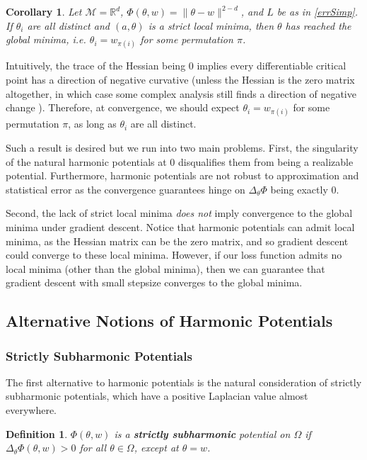 \documentclass{article}
\newtheorem{corollary}[theorem]{Corollary}
\newtheorem{definition}[theorem]{Definition}
\newcommand{\R}{{\mathbb{R}}}
\begin{document}
\begin{corollary}
Let $\mathcal{M} = \R^d$, $\Phi(\theta,w) = \|\theta-w\|^{2-d}$, and $L$ be as in \eqref{errSimp}. If $\theta_i$ are all distinct and $(a,\theta)$ is a strict local minima, then $\theta$ has reached the global minima, i.e. $\theta_i = w_{\pi(i)}$ for some permutation $\pi$. 
\end{corollary}

Intuitively, the trace of the Hessian being 0 implies every differentiable critical point has a direction of negative curvative (unless the Hessian is the zero matrix altogether, in which case some complex analysis still finds a direction of negative change \cite{arnold1985mathematical}). Therefore, at convergence, we should expect $\theta_i = w_{\pi(i)}$ for some permutation $\pi$, as long as $\theta_i$ are all distinct. 

Such a result is desired but we run into two main problems. First, the singularity of the natural harmonic potentials at $0$ disqualifies them from being a realizable potential. Furthermore, harmonic potentials are not robust to approximation and statistical error as the convergence guarantees hinge on $\Delta_\theta\Phi$ being exactly 0. 

Second, the lack of strict local minima {\it does not} imply convergence to the global minima under gradient descent. Notice that harmonic potentials can admit local minima, as the Hessian matrix can be the zero matrix, and so gradient descent could converge to these local minima. However, if our loss function admits no local minima (other than the global minima), then we can guarantee that gradient descent with small stepsize converges to the global minima. 

\subsection{Alternative Notions of Harmonic Potentials}

\subsubsection{Strictly Subharmonic Potentials}

The first alternative to harmonic potentials is the natural consideration of strictly subharmonic potentials, which have a positive Laplacian value almost everywhere. 

\begin{definition}
$\Phi(\theta,w)$ is a {\bf strictly subharmonic} potential on $\Omega$ if $\Delta_\theta \Phi(\theta,w) > 0$ for all $\theta \in \Omega$, except at $\theta = w$.
\end{definition}
\end{document}
